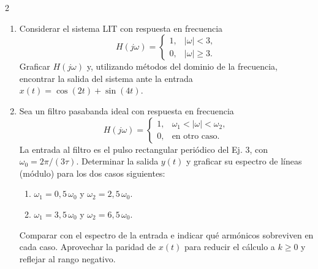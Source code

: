 \documentclass[10pt,a4paper]{article}
\begin{document}
\begin{multicols}{2}
\begin{enumerate}
			\item Considerar el sistema LIT con respuesta en frecuencia
			\[
				H(j\omega) =
				\begin{cases}
					1, & |\omega| < 3, \\
					0, & |\omega| \geq 3.
				\end{cases}
			\]
			Graficar $H(j\omega)$ y, utilizando métodos del dominio de la frecuencia, encontrar la salida del sistema ante la entrada $x(t) = \cos(2t) + \sin(4t)$.

			\item Sea un filtro pasabanda ideal con respuesta en frecuencia
			\[
				H(j\omega) =
				\begin{cases}
					1, & \omega_1 < |\omega| < \omega_2, \\
					0, & \text{en otro caso.}
				\end{cases}
			\]
			La entrada al filtro es el pulso rectangular periódico del Ej. 3, con $\omega_0 = 2\pi/(3\tau)$. Determinar la salida $y(t)$ y graficar su espectro de líneas (módulo) para los dos casos siguientes:
			\begin{enumerate}
				\item $\omega_1 = 0{,}5\,\omega_0$ y $\omega_2 = 2{,}5\,\omega_0$.
				\item $\omega_1 = 3{,}5\,\omega_0$ y $\omega_2 = 6{,}5\,\omega_0$.
			\end{enumerate}
			Comparar con el espectro de la entrada e indicar qué armónicos sobreviven en cada caso. Aprovechar la paridad de $x(t)$ para reducir el cálculo a $k \geq 0$ y reflejar al rango negativo.

		\end{enumerate}

	\end{multicols}
\end{document}
